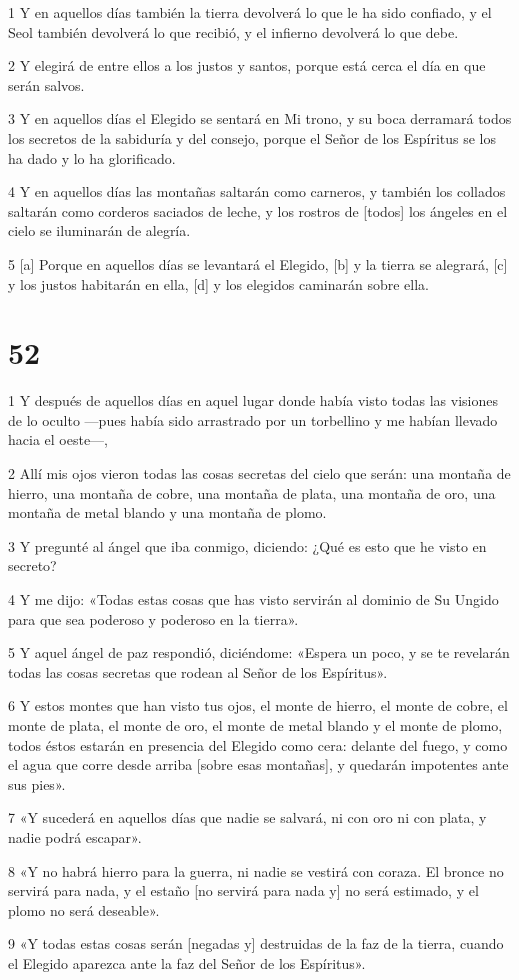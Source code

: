 \par 1 Y en aquellos días también la tierra devolverá lo que le ha sido confiado, y el Seol también devolverá lo que recibió, y el infierno devolverá lo que debe.
\par 2 Y elegirá de entre ellos a los justos y santos, porque está cerca el día en que serán salvos.
\par 3 Y en aquellos días el Elegido se sentará en Mi trono, y su boca derramará todos los secretos de la sabiduría y del consejo, porque el Señor de los Espíritus se los ha dado y lo ha glorificado.
\par 4 Y en aquellos días las montañas saltarán como carneros, y también los collados saltarán como corderos saciados de leche, y los rostros de [todos] los ángeles en el cielo se iluminarán de alegría.
\par 5 [a] Porque en aquellos días se levantará el Elegido, [b] y la tierra se alegrará, [c] y los justos habitarán en ella, [d] y los elegidos caminarán sobre ella.

\chapter{52}

\par 1 Y después de aquellos días en aquel lugar donde había visto todas las visiones de lo oculto —pues había sido arrastrado por un torbellino y me habían llevado hacia el oeste—,
\par 2 Allí mis ojos vieron todas las cosas secretas del cielo que serán: una montaña de hierro, una montaña de cobre, una montaña de plata, una montaña de oro, una montaña de metal blando y una montaña de plomo.
\par 3 Y pregunté al ángel que iba conmigo, diciendo: ¿Qué es esto que he visto en secreto?
\par 4 Y me dijo: «Todas estas cosas que has visto servirán al dominio de Su Ungido para que sea poderoso y poderoso en la tierra».
\par 5 Y aquel ángel de paz respondió, diciéndome: «Espera un poco, y se te revelarán todas las cosas secretas que rodean al Señor de los Espíritus».
\par 6 Y estos montes que han visto tus ojos, el monte de hierro, el monte de cobre, el monte de plata, el monte de oro, el monte de metal blando y el monte de plomo, todos éstos estarán en presencia del Elegido como cera: delante del fuego, y como el agua que corre desde arriba [sobre esas montañas], y quedarán impotentes ante sus pies».
\par 7 «Y sucederá en aquellos días que nadie se salvará, ni con oro ni con plata, y nadie podrá escapar».
\par 8 «Y no habrá hierro para la guerra, ni nadie se vestirá con coraza. El bronce no servirá para nada, y el estaño [no servirá para nada y] no será estimado, y el plomo no será deseable».
\par 9 «Y todas estas cosas serán [negadas y] destruidas de la faz de la tierra, cuando el Elegido aparezca ante la faz del Señor de los Espíritus».

